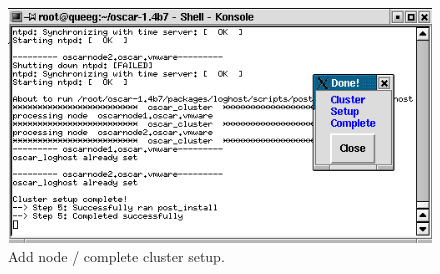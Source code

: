 \begin{figure}[!b]
  \begin{center}
    \centerline{\includegraphics[scale=\imgscale]{figs/9f_sbs-add-node-complete}}
    \caption{Add node / complete cluster setup.}
    \label{fig:sbs-add-node1-cluster-setup}
  \end{center}
\end{figure}

